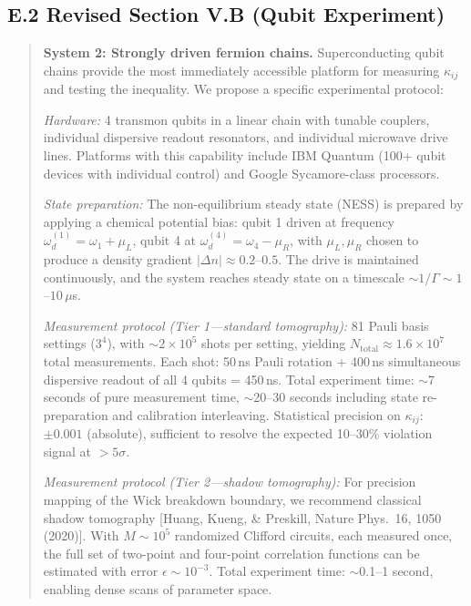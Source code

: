 \documentclass[11pt,a4paper]{article}
\begin{document}
\subsection*{E.2 Revised Section V.B (Qubit Experiment)}

\begin{quote}
\small
\textbf{System 2: Strongly driven fermion chains.} Superconducting qubit chains provide the most immediately accessible platform for measuring $\kappa_{ij}$ and testing the inequality. We propose a specific experimental protocol:

\textit{Hardware:} 4 transmon qubits in a linear chain with tunable couplers, individual dispersive readout resonators, and individual microwave drive lines. Platforms with this capability include IBM Quantum (100+ qubit devices with individual control) and Google Sycamore-class processors.

\textit{State preparation:} The non-equilibrium steady state (NESS) is prepared by applying a chemical potential bias: qubit 1 driven at frequency $\omega_d^{(1)} = \omega_1 + \mu_L$, qubit 4 at $\omega_d^{(4)} = \omega_4 - \mu_R$, with $\mu_L, \mu_R$ chosen to produce a density gradient $|\Delta n| \approx 0.2$--$0.5$. The drive is maintained continuously, and the system reaches steady state on a timescale $\sim 1/\Gamma \sim 1$--$10\,\mu$s.

\textit{Measurement protocol (Tier 1---standard tomography):} 81 Pauli basis settings ($3^4$), with $\sim 2 \times 10^5$ shots per setting, yielding $N_{\text{total}} \approx 1.6 \times 10^7$ total measurements. Each shot: 50\,ns Pauli rotation + 400\,ns simultaneous dispersive readout of all 4 qubits = 450\,ns. Total experiment time: $\sim$7 seconds of pure measurement time, $\sim$20--30 seconds including state re-preparation and calibration interleaving. Statistical precision on $\kappa_{ij}$: $\pm 0.001$ (absolute), sufficient to resolve the expected 10--30\% violation signal at $>5\sigma$.

\textit{Measurement protocol (Tier 2---shadow tomography):} For precision mapping of the Wick breakdown boundary, we recommend classical shadow tomography [Huang, Kueng, \& Preskill, Nature Phys.\ 16, 1050 (2020)]. With $M \sim 10^5$ randomized Clifford circuits, each measured once, the full set of two-point and four-point correlation functions can be estimated with error $\epsilon \sim 10^{-3}$. Total experiment time: $\sim$0.1--1 second, enabling dense scans of parameter space.


\end{quote}
\end{document}
